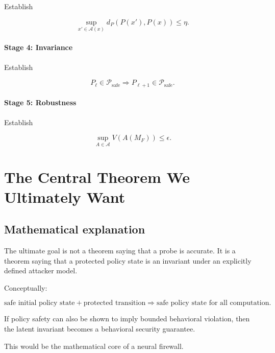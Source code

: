 \documentclass[11pt]{article}
\newcommand{\A}{\mathcal{A}}
\newcommand{\Psafe}{\mathcal{P}_{\mathrm{safe}}}
\begin{document}
Establish

\begin{equation}
\sup_{x'\in\A(x)}
d_P(P(x'),P(x))
\leq\eta.
\end{equation}

\paragraph{Stage 4: Invariance}

Establish

\begin{equation}
P_\ell\in\Psafe
\Rightarrow
P_{\ell+1}\in\Psafe.
\end{equation}

\paragraph{Stage 5: Robustness}

Establish

\begin{equation}
\sup_{A\in\mathcal A}
V(A(M_F))
\leq\epsilon.
\end{equation}

\section{The Central Theorem We Ultimately Want}

\subsection*{Mathematical explanation}

The ultimate goal is not a theorem saying that a probe is accurate. It is a
theorem saying that a protected policy state is an invariant under an
explicitly defined attacker model.

Conceptually:

\begin{equation}
\text{safe initial policy state}
+
\text{protected transition}
\Rightarrow
\text{safe policy state for all computation}.
\end{equation}

If policy safety can also be shown to imply bounded behavioral violation,
then the latent invariant becomes a behavioral security guarantee.

This would be the mathematical core of a neural firewall.
\end{document}
